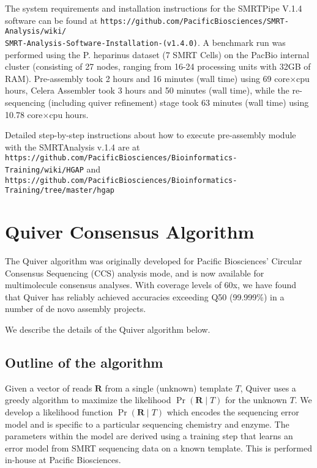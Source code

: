 \documentclass[11pt]{article}
\begin{document}
The system requirements and installation instructions for the SMRTPipe V.1.4 software can be found at
{\tt https://github.com/PacificBiosciences/SMRT-Analysis/wiki/\\
SMRT-Analysis-Software-Installation-(v1.4.0)}. A benchmark run was performed using the P. heparinus dataset (7 SMRT Cells) on the PacBio internal cluster (consisting of 27 nodes, ranging from 16-24 processing units with 32GB of RAM).  Pre-assembly took 2 hours and 16 minutes (wall time) using 69 core$\times$cpu hours, Celera Assembler took 3 hours and 50 minutes (wall time), while the re-sequencing (including quiver refinement) stage took 63 minutes (wall time) using 10.78 core$\times$cpu hours.
 
Detailed step-by-step instructions about how to execute pre-assembly module with the SMRTAnalysis v.1.4 are at \\
{\tt https://github.com/PacificBiosciences/Bioinformatics-Training/wiki/HGAP} and \\
{\tt https://github.com/PacificBiosciences/Bioinformatics-Training/tree/master/hgap}

\section{Quiver Consensus Algorithm}

The Quiver algorithm was originally developed for Pacific Biosciences' Circular Consensus Sequencing (CCS) analysis mode, and is now available for multimolecule consensus analyses.  With coverage levels of 60x, we have found that Quiver has reliably achieved accuracies exceeding Q50 (99.999\%) in a number of de novo assembly projects.

We describe the details of the Quiver algorithm below.

\subsection{Outline of the algorithm}

Given a vector of reads $\mathbf{R}$ from a single (unknown) template $T$, Quiver uses a greedy algorithm to maximize the likelihood $\Pr(\mathbf{R} \mid T)$ for the unknown $T$. We develop a likelihood function $\Pr(\mathbf{R} \mid T)$ which encodes the sequencing error model and is specific to a particular sequencing chemistry and enzyme.  The parameters within the model are derived using a training step that learns an error model from SMRT sequencing data on a known template. This is performed in-house at Pacific Biosciences.
\end{document}
